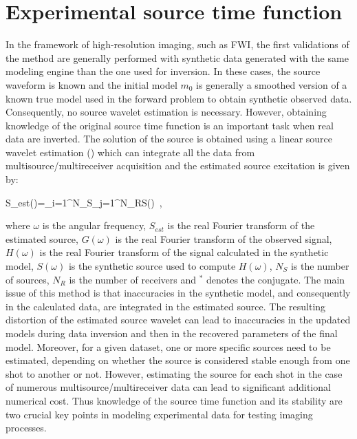 \documentclass[extra,mreferee]{gji}
\begin{document}

\section{Experimental source time function}

In the framework of high-resolution imaging, such as FWI, the first validations of the method are generally performed with synthetic data generated with the same modeling engine than the one used for inversion. In these cases, the source waveform is known and the initial model $m_{0}$ is generally a smoothed version of a known true model used in the forward problem to obtain synthetic observed data. Consequently, no source wavelet estimation is necessary. However, obtaining knowledge of the original source time function is an important task when real data are inverted. The solution of the source is obtained using a linear source wavelet estimation (\cite{pratt1999fwi,virieux2009fwi}) which can integrate all the data from multisource/multireceiver acquisition and the estimated source excitation is given by:

\equation
S_{est}(\omega)=\sum\limits_{i=1}^{N_{S}}\sum\limits_{j=1}^{N_{R}}S(\omega)\ ,
\label{eq:lswe}
\endequation

where $\omega$ is the angular frequency, $S_{est}$ is the real Fourier transform of the estimated source, $G(\omega)$ is the real Fourier transform of the observed signal, $H(\omega)$ is the real Fourier transform of the signal calculated in the synthetic model, $S(\omega)$ is the synthetic source used to compute $H(\omega)$, $N_{S}$ is the number of sources, $N_{R}$ is the number of receivers and $^{*}$ denotes the conjugate. The main issue of this method is that inaccuracies in the synthetic model, and consequently in the calculated data, are integrated in the estimated source. The resulting distortion of the estimated source wavelet can lead to inaccuracies in the updated models during data inversion and then in the recovered parameters of the final model. Moreover, for a given dataset, one or more specific sources need to be estimated, depending on whether the source is considered stable enough from one shot to another or not. However, estimating the source for each shot in the case of numerous multisource/multireceiver data can lead to significant additional numerical cost. Thus knowledge of the source time function and its stability are two crucial key points in modeling experimental data for testing imaging processes.
\end{document}
